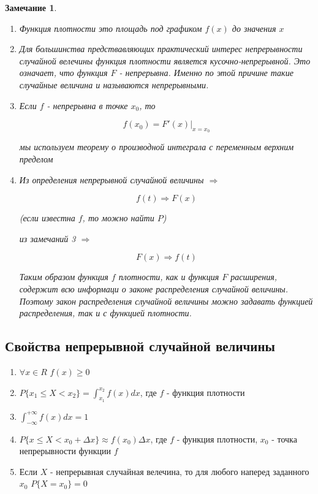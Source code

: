 \documentclass[a4paper, 14pt]{report}
\newtheorem{note}{Замечание}[chapter]
\begin{document}
\begin{note}
    \begin{enumerate}
        \item Функция плотности это площадь под графиком $f(x)$ до значения $x$
        \item Для большинства предствавляющих практический интерес непрерывности случайной велечины функция плотности является кусочно-непрерывной. Это означает, что функция $F$ - непрерывна. Именно по этой причине такие случайные величина и называются непрерывными.
        \item Если $f$ - непрерывна в точке $x_0$, то 

            $$
            f(x_0) = F'(x) |_{x=x_0}
            $$

            мы используем теорему о производной интеграла с переменным верхним пределом

        \item Из определения непрерывной случайной величины $\Rightarrow$

            $$
            f(t) \Rightarrow F(x)
            $$

            (если известна $f$, то можно найти $P$)

            из замечаний 3 $\Rightarrow$ 

            $$
            F(x) \Rightarrow f(t)
            $$

            Таким образом функция $f$ плотности, как и функция $F$ расширения, содержит всю информаци о законе распределения случайной величины. Поэтому закон распределения случайной величины можно задавать функцией распределения, так и с функцией плотности.
    \end{enumerate}
\end{note}

\subsection{Свойства непрерывной случайной величины}

\begin{enumerate}
    \item $\forall x \in R$ $f(x) \geq 0$
    \item $P\{x_1 \le X < x_2 \} = \int_{x_1}^{x_2} f(x) dx$, где $f$ - функция плотности
    \item $\int_{-\infty}^{+\infty} f(x)dx = 1$
    \item $P\{x \le X < x_0 + \Delta x\} \approx f(x_0) \Delta x$, где $f$ - функция плотности, $x_0$ - точка непрерывности функции $f$
    \item Если $X$ - непрерывная случайная велечина, то для любого наперед заданного $x_0$
        $P\{X = x_0\} = 0$
\end{enumerate}
\end{document}
